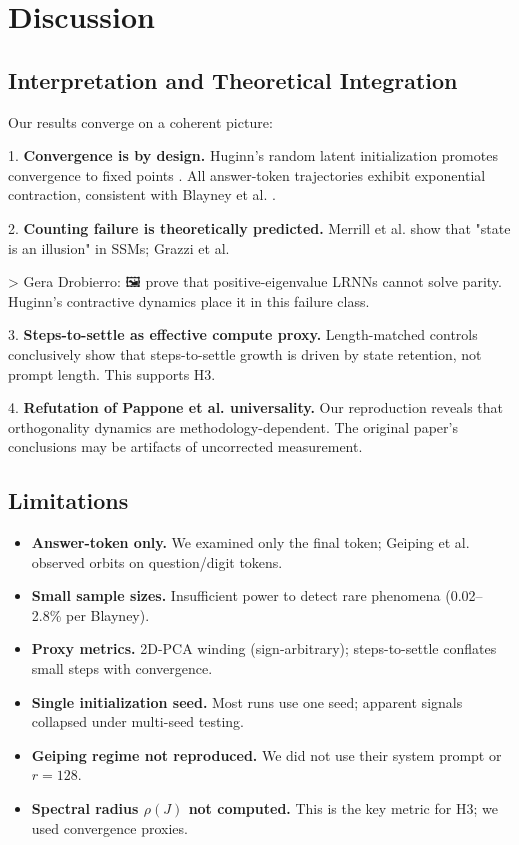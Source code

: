 \section{Discussion}

\subsection{Interpretation and Theoretical Integration}

Our results converge on a coherent picture:

1. \textbf{Convergence is by design.} Huginn's random latent initialization promotes convergence to fixed points \cite{geiping2025scaling}. All answer-token trajectories exhibit exponential contraction, consistent with Blayney et al. \cite{blayney2026mechanistic}.

2. \textbf{Counting failure is theoretically predicted.} Merrill et al. \cite{merrill2024illusion} show that "state is an illusion" in SSMs; Grazzi et al.

> Gera Drobierro:
🖼 \cite{grazzi2024unlocking} prove that positive-eigenvalue LRNNs cannot solve parity. Huginn's contractive dynamics place it in this failure class.

3. \textbf{Steps-to-settle as effective compute proxy.} Length-matched controls conclusively show that steps-to-settle growth is driven by state retention, not prompt length. This supports H3.

4. \textbf{Refutation of Pappone et al. universality.} Our reproduction reveals that orthogonality dynamics are methodology-dependent. The original paper's conclusions may be artifacts of uncorrected measurement.

\subsection{Limitations}

\begin{itemize}
    \item \textbf{Answer-token only.} We examined only the final token; Geiping et al. observed orbits on question/digit tokens.
    \item \textbf{Small sample sizes.} Insufficient power to detect rare phenomena (0.02--2.8\% per Blayney).
    \item \textbf{Proxy metrics.} 2D-PCA winding (sign-arbitrary); steps-to-settle conflates small steps with convergence.
    \item \textbf{Single initialization seed.} Most runs use one seed; apparent signals collapsed under multi-seed testing.
    \item \textbf{Geiping regime not reproduced.} We did not use their system prompt or $r=128$.
    \item \textbf{Spectral radius $\rho(J)$ not computed.} This is the key metric for H3; we used convergence proxies.
\end{itemize}

